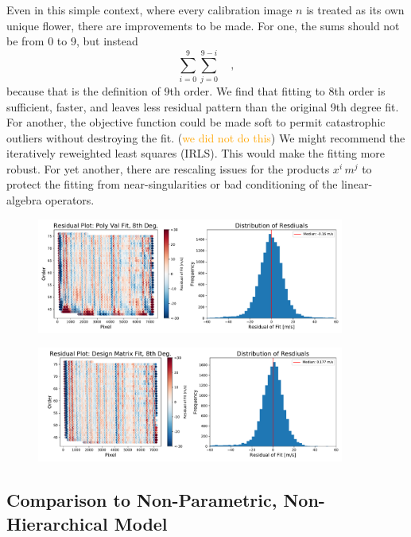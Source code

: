 \documentclass[12pt, letterpaper]{article}
\newcommand{\lz}[1]{\textcolor{orange}{#1}}
\begin{document}
Even in this simple context, where every calibration image $n$ is
treated as its own unique flower, there are improvements to be
made.
For one, the sums should not be from 0 to 9, but instead
\begin{equation}
\sum_{i=0}^9\sum_{j=0}^{9-i}
\quad ,
\end{equation}
because that is the definition of 9th order.  We find that fitting to 8th order is sufficient, faster, and leaves less residual pattern than the original 9th degree fit.
For another, the objective function could be made soft to permit
catastrophic outliers without destroying the fit. (\lz{we did not do this})
We might recommend the iteratively reweighted least squares (IRLS).
This would make the fitting more robust.
For yet another, there are rescaling issues for the products $x^i\,m^j$ to
protect the fitting from near-singularities or bad conditioning of the
linear-algebra operators.


\begin{figure}[h]
\centering
\includegraphics[width=0.9\textwidth]{Figures/polyval2d.pdf}
\caption{}
\label{fig:polyValFit}
\end{figure} 

\begin{figure}[h]
\centering
\includegraphics[width=0.9\textwidth]{Figures/designMatrix.pdf}
\caption{}
\label{fig:dsnMFit}
\end{figure} 

\subsection{Comparison to Non-Parametric, Non-Hierarchical Model}
\end{document}

